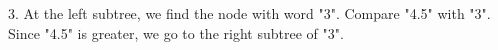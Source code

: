 \documentclass[preview]{standalone}
\begin{document}
3. At the left subtree, we find the node with word "3". Compare "4.5" with "3". Since "4.5" is greater, we go to the right subtree of "3".\\
\end{document}
